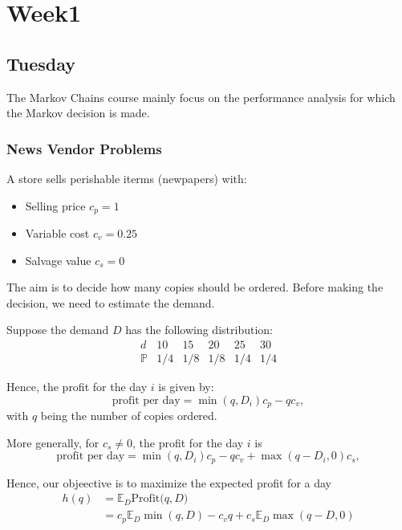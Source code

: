 
\chapter{Week1}

\section{Tuesday}

The Markov Chains course mainly focus on the performance analysis for which the Markov decision is made.

\subsection{News Vendor Problems}

A store sells perishable iterms (newpapers) with:
\begin{itemize}
\item
Selling price $c_p=1$
\item
Variable cost $c_v = 0.25$
\item
Salvage value $c_s=0$
\end{itemize}

The aim is to decide how many copies should be ordered. Before making the decision, we need to estimate the demand.

Suppose the demand $D$ has the following distribution:
\[
\begin{array}{llllll}
d&10&15&20&25&30
\\
\mathbb{P}&1/4&1/8&1/8&1/4&1/4
\end{array}
\]

Hence, the profit for the day $i$ is given by:
\[
\mbox{profit per day} = \min(q,D_i)c_p - qc_v,
\]
with $q$ being the number of copies ordered.

More generally, for $c_s\ne 0$, the profit for the day $i$ is
\[
\mbox{profit per day} = \min(q,D_i)c_p - qc_v+\max(q-D_i,0)c_s,
\]

Hence, our objeective is to maximize the expected profit for a day
\begin{equation}
\begin{aligned}
h(q)&=\mathbb{E}_D\mbox{Profit($q,D$)}\\
&=c_p\mathbb{E}_D\min(q,D) - c_vq+c_s\mathbb{E}_D\max(q-D,0)
\end{aligned}
\end{equation}











